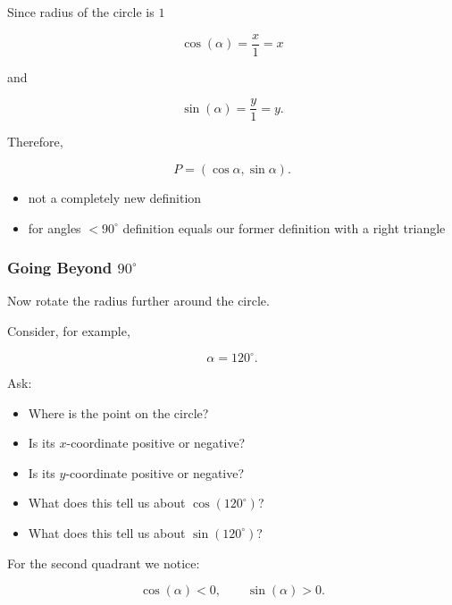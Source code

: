 \documentclass[a4paper,11pt]{article}
\begin{document}
Since radius of the circle is $1$ 

\begin{equation}
    \cos(\alpha)
    =
    \frac{x}{1}
    =
    x
\end{equation}

and

\begin{equation}
    \sin(\alpha)
    =
    \frac{y}{1}
    =
    y.
\end{equation}

Therefore,

\begin{equation}
    \boxed{P=(\cos\alpha,\sin\alpha)}.
\end{equation}

\begin{itemize}
    \item not a completely new definition
    \item for angles $ < 90^\circ $ definition equals our former definition with a right triangle 
\end{itemize}


\subsubsection*{ Going Beyond $90^\circ$}

Now rotate the radius further around the circle.

Consider, for example,

\begin{equation}
    \alpha=120^\circ.
\end{equation}

Ask:

\begin{itemize}
    \item Where is the point on the circle?
    \item Is its $x$-coordinate positive or negative?
    \item Is its $y$-coordinate positive or negative?
    \item What does this tell us about $\cos(120^\circ)$?
    \item What does this tell us about $\sin(120^\circ)$?
\end{itemize}

For the second quadrant we notice:

\begin{equation}
    \cos(\alpha)<0,
    \qquad
    \sin(\alpha)>0.
\end{equation}
\end{document}
